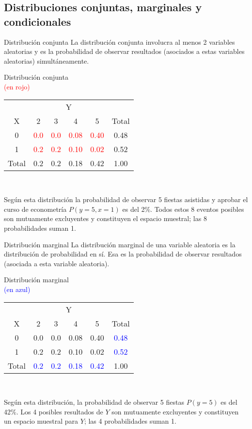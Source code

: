 \subsection{Distribuciones conjuntas, marginales y condicionales}
\begin{frame}{Distribución conjunta}
	La distribución conjunta involucra al menos 2 variables aleatorias y es la probabilidad de observar resultados (asociados a estas variables aleatorias) simultáneamente.\\
	\smallskip
	{\small
		\centering
		Distribución conjunta\\
		\textcolor{red}{(en rojo)}\\
		\smallskip
		\begin{tabular}{c|cccc|c} 
			& \multicolumn{4}{c|}{Y} & \\
			X & 2 & 3 & 4 & 5 & Total \\
			\hline
			0 & \textcolor{red}{0.0} & \textcolor{red}{0.0}& \textcolor{red}{0.08} & \textcolor{red}{0.40} & 0.48 \\
			1 & \textcolor{red}{0.2}& \textcolor{red}{0.2}& \textcolor{red}{0.10} & \textcolor{red}{0.02} & 0.52 \\
			\hline
			Total & 0.2 & 0.2 & 0.18 & 0.42 & 1.00
		\end{tabular}\\}
	\medskip
	Según esta distribución la probabilidad de observar 5 fiestas asistidas y aprobar el curso de econometría $P (y = 5, x = 1)$ es del 2\%. Todos estos 8 eventos posibles son mutuamente excluyentes y constituyen el espacio muestral; las 8 probabilidades suman 1.
\end{frame}
\begin{frame}{Distribución marginal}
	La distribución marginal de una variable aleatoria es la distribución de probabilidad en sí. Esa es la probabilidad de observar resultados (asociada a esta variable aleatoria).\\
	\smallskip
	{\small
		\centering
		Distribución marginal\\
		\textcolor{blue}{(en azul)}\\
		\smallskip
		\begin{tabular}{c|cccc|c} 
			& \multicolumn{4}{c|}{Y} & \\
			X & 2 & 3 & 4 & 5 & Total \\
			\hline
			0 & 0.0 & 0.0& 0.08 & 0.40 & \textcolor{blue}{0.48} \\
			1 & 0.2& 0.2& 0.10 & 0.02 & \textcolor{blue}{0.52} \\
			\hline
			Total & \textcolor{blue}{0.2}& \textcolor{blue}{0.2}& \textcolor{blue}{0.18} & \textcolor{blue}{0.42} & 1.00
		\end{tabular}\\}
	\medskip
	Según esta distribución, la probabilidad de observar 5 fiestas $P (y = 5)$ es del 42\%. Los 4 posibles resultados de $Y$ son mutuamente excluyentes y constituyen un espacio muestral para $Y$; las 4 probabilidades suman 1.
\end{frame}
